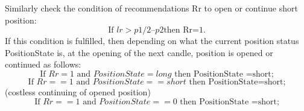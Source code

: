 \documentclass[runningheads,a4paper]{llncs}
\begin{document}
Similarly check the condition of recommendations Rr to open or continue short position:
\begin{equation}
\text{If } lr>p1/2 – p2 \text {then Rr=1.}
\end{equation}
If this condition is fulfilled, then depending on what the current position status PositionState is, at the opening of the next candle, position is opened or continued as follows: \\
\begin{equation}
\text{If } Rr=1 \text{ and } PositionState =long \text{ then PositionState =short;}
\end{equation}
\begin{equation}
\text{If } Rr==1 \text{ and } PositionState ==short \text{ then PositionState=short;}
\end{equation}
(costless continuing of opened position)
\begin{equation}
\text{If } Rr==1 \text{ and }  PositionState ==0 \text{ then  PositionState =short;}
\end{equation}
\end{document}
